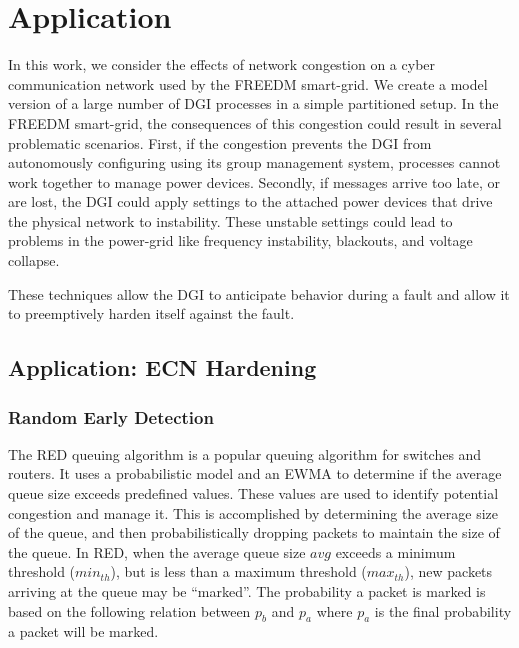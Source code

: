 


\chapter{Application}

In this work, we consider the effects of network congestion on a cyber communication network used by the \ac{FREEDM} smart-grid.
We create a model version of a large number of \ac{DGI} processes in a simple partitioned setup.
In  the \ac{FREEDM} smart-grid, the consequences of this congestion could result in several problematic scenarios.
First, if the congestion prevents the \ac{DGI} from autonomously configuring using its group management system, processes cannot work together to manage power devices.
Secondly, if messages arrive too late, or are lost, the \ac{DGI} could apply settings to the attached power devices that drive the physical network to instability.
These unstable settings could lead to problems in the power-grid like frequency instability, blackouts, and voltage collapse.



These techniques allow the DGI to anticipate behavior during a fault and allow it to preemptively harden itself against the fault.

\section{Application: ECN Hardening}


\subsection{Random Early Detection}
The \ac{RED} queuing algorithm is a popular queuing algorithm for switches and routers.
It uses a probabilistic model and an \ac{EWMA} to determine if the average queue size exceeds predefined values.
These values are used to identify potential congestion and manage it.
This is accomplished by determining the average size of the queue, and then probabilistically dropping packets to maintain the size of the queue.
In \ac{RED}, when the average queue size $avg$ exceeds a minimum threshold ($min_{th}$), but is less than a maximum threshold ($max_{th}$), new packets arriving at the queue may be ``marked''.
The probability a packet is marked is based on the following relation between $p_{b}$ and $p_{a}$ where $p_{a}$ is the final probability a packet will be marked.

